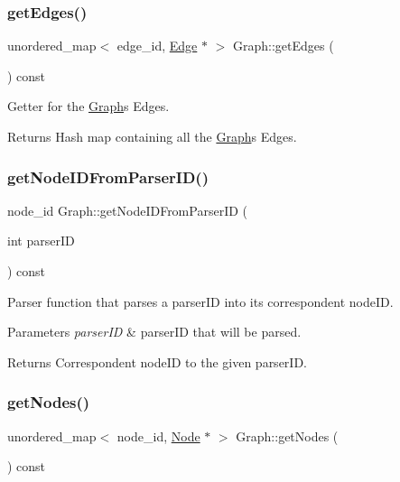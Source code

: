 \subsubsection{\texorpdfstring{get\+Edges()}{getEdges()}}
{\footnotesize\ttfamily unordered\+\_\+map$<$ edge\+\_\+id, \hyperlink{class_edge}{Edge} $\ast$ $>$ Graph\+::get\+Edges (\begin{DoxyParamCaption}{ }\end{DoxyParamCaption}) const}

Getter for the \hyperlink{class_graph}{Graph}\textquotesingle{}s Edges.

\begin{DoxyReturn}{Returns}
Hash map containing all the \hyperlink{class_graph}{Graph}\textquotesingle{}s Edges. 
\end{DoxyReturn}
\hypertarget{class_graph_aec10981cceac64d033e2e0de5b34c995}{}\label{class_graph_aec10981cceac64d033e2e0de5b34c995} 
\subsubsection{\texorpdfstring{get\+Node\+I\+D\+From\+Parser\+I\+D()}{getNodeIDFromParserID()}}
{\footnotesize\ttfamily node\+\_\+id Graph\+::get\+Node\+I\+D\+From\+Parser\+ID (\begin{DoxyParamCaption}\item[{int}]{parser\+ID }\end{DoxyParamCaption}) const}

Parser function that parses a parser\+ID into its correspondent node\+ID.


\begin{DoxyParams}{Parameters}
{\em parser\+ID} & parser\+ID that will be parsed.\\
\hline
\end{DoxyParams}
\begin{DoxyReturn}{Returns}
Correspondent node\+ID to the given parser\+ID. 
\end{DoxyReturn}
\hypertarget{class_graph_aa64f6696d40b6a8e0d92df399ed11310}{}\label{class_graph_aa64f6696d40b6a8e0d92df399ed11310} 
\subsubsection{\texorpdfstring{get\+Nodes()}{getNodes()}}
{\footnotesize\ttfamily unordered\+\_\+map$<$ node\+\_\+id, \hyperlink{class_node}{Node} $\ast$ $>$ Graph\+::get\+Nodes (\begin{DoxyParamCaption}{ }\end{DoxyParamCaption}) const}

